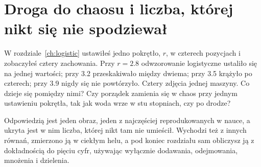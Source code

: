 
\chapter{Droga do chaosu i liczba, której nikt się nie spodziewał}
\label{ch:bifurcations}

\noindent
W rozdziale~\ref{ch:logistic} ustawiłeś jedno pokrętło, $r$, w czterech
pozycjach i zobaczyłeś cztery zachowania. Przy $r = \num{2.8}$ odwzorowanie
logistyczne ustaliło się na jednej wartości; przy \num{3.2} przeskakiwało
między dwiema; przy \num{3.5} krążyło po czterech; przy \num{3.9} nigdy się
nie powtórzyło. Cztery zdjęcia jednej maszyny. Co dzieje się pomiędzy nimi?
Czy porządek zamienia się w chaos przy jednym ustawieniu pokrętła, tak jak
woda wrze w stu stopniach, czy po drodze?

Odpowiedzią jest jeden obraz, jeden z najczęściej reprodukowanych w nauce, a
ukryta jest w nim liczba, której nikt tam nie umieścił. Wychodzi też z innych
równań, zmierzono ją w ciekłym helu, a pod koniec rozdziału sam obliczysz ją
z dokładnością do pięciu cyfr, używając wyłącznie dodawania, odejmowania,
mnożenia i dzielenia.

